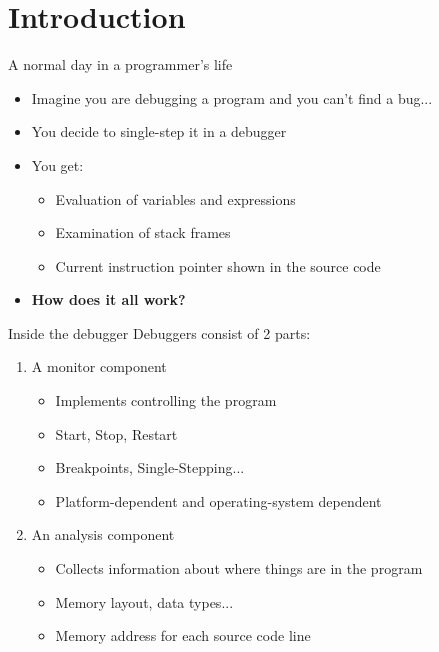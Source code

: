 
\section{Introduction}


\begin{frame}{A normal day in a programmer's life}
\begin{itemize}
\item Imagine you are debugging a program and you can't find a bug...
\item You decide to single-step it in a \alert{debugger}
\item You get:
	\begin{itemize}
	\item Evaluation of variables and expressions
	\item Examination of stack frames
	\item Current instruction pointer shown in the source code
	\end{itemize}
\pause
\item \textbf{How does it all work?}
\end{itemize}
\end{frame}


\begin{frame}{Inside the debugger}
Debuggers consist of 2 parts:
\begin{enumerate}
\item A \alert{monitor} component
	\begin{itemize}
	\normalsize
	\item Implements controlling the program
	\item Start, Stop, Restart
	\item \alert{Breakpoints}, Single-Stepping...
	\item Platform-dependent and operating-system dependent
	\end{itemize}
\item An \alert{analysis} component
	\begin{itemize}
	\normalsize
	\item Collects information about where things are in the program
	\item Memory layout, data types...
	\item Memory address for each source code line
	\end{itemize}
\end{enumerate}
\end{frame}


